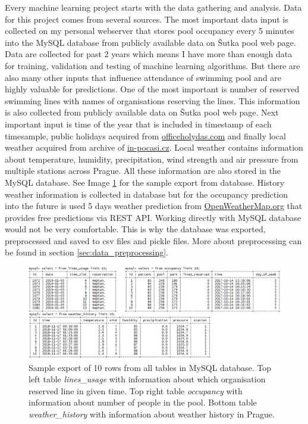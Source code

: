 \documentclass{article}
\begin{document}
Every machine learning project starts with the data gathering and analysis. Data for this project comes from several sources. The most important data input is collected on my personal webserver that stores pool occupancy every 5 minutes into the MySQL database from publicly available data on \v{S}utka pool web page. Data are collected for past 2 years which means I have more than enough data for training, validation and testing of machine learning algorithms. But there are also many other inputs that influence attendance of swimming pool and are highly valuable for predictions. One of the most important is number of reserved swimming lines with names of organisations reserving the lines. This information is also collected from publicly available data on \v{S}utka pool web page. Next important input is time of the year that is included in timestamp of each timesample, public holidays acquired from \href{https://www.officeholidays.com/countries/czech-republic}{officeholydas.com} and finally local weather acquired from archive of \href{https://www.in-pocasi.cz/archiv/}{in-pocasi.cz}. Local weather contains information about temperature, humidity, precipitation, wind strength and air pressure from multiple stations across Prague. All these information are also stored in the MySQL database. See Image \ref{fig:db_export} for the sample export from database. History weather information is collected in database but for the occupancy prediction into the future is used 5 days weather prediction from \href{https://openweathermap.org/forecast5}{OpenWeatherMap.org} that provides free predictions via REST API. Working directly with MySQL database would not be very comfortable. This is why the database was exported, preprocessed and saved to csv files and pickle files. More about preprocessing can be found in section \ref{sec:data_preprocessing}. 

\begin{figure}[h!]
\centering
\includegraphics[width=16cm]{imgs/db_export.png}
\caption{Sample export of 10 rows from all tables in MySQL database. Top left table \emph{lines\_usage} with information about which organisation reserved line in given time. Top right table \emph{occupancy} with information about number of people in the pool. Bottom table \emph{weather\_history} with information about weather history in Prague.}
\label{fig:db_export}
\end{figure}
\end{document}
